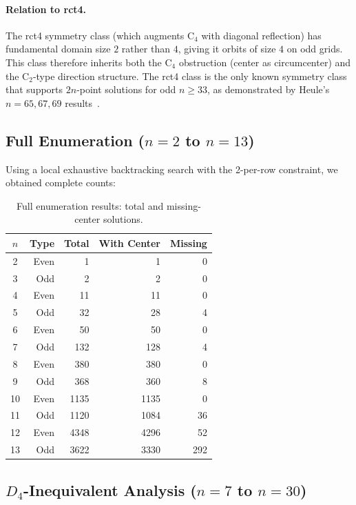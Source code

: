 \documentclass[11pt,a4paper]{article}
\theoremstyle{plain}
\theoremstyle{definition}
\begin{document}
\paragraph{Relation to rct4.}
The rct4 symmetry class (which augments C$_4$ with diagonal reflection) has fundamental domain size $2$ rather than $4$, giving it orbits of size $4$ on odd grids. This class therefore inherits both the C$_4$ obstruction (center as circumcenter) and the C$_2$-type direction structure. The rct4 class is the only known symmetry class that supports $2n$-point solutions for odd $n\ge 33$, as demonstrated by Heule's $n=65,67,69$ results~\cite{heule2026}.

\label{sec:results}

\subsection{Full Enumeration ($n=2$ to $n=13$)}

Using a local exhaustive backtracking search with the 2-per-row constraint, we obtained complete counts:

\begin{table}[H]
\centering
\caption{Full enumeration results: total and missing-center solutions.}
\label{tab:full}
\begin{tabular}{crrrr}
\toprule
$n$ & Type & Total & With Center & Missing \\
\midrule
2 & Even & 1 & 1 & 0\\
3 & Odd & 2 & 2 & 0\\
4 & Even & 11 & 11 & 0\\
5 & Odd & 32 & 28 & 4\\
6 & Even & 50 & 50 & 0\\
7 & Odd & 132 & 128 & 4\\
8 & Even & 380 & 380 & 0\\
9 & Odd & 368 & 360 & 8\\
10 & Even & 1135 & 1135 & 0\\
11 & Odd & 1120 & 1084 & 36\\
12 & Even & 4348 & 4296 & 52\\
13 & Odd & 3622 & 3330 & 292\\
\bottomrule
\end{tabular}
\end{table}

\subsection{$D_4$-Inequivalent Analysis ($n=7$ to $n=30$)}
\end{document}
